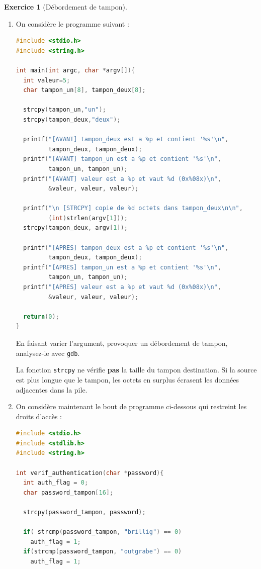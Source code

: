 \documentclass[a4paper,11pt]{article}
\theoremstyle{plain}
\theoremstyle{definition}
\newtheorem{exercice}{Exercice}
\begin{document}
\begin{exercice}[Débordement de tampon]
\begin{enumerate}
\item
On considère le programme suivant :
\begin{lstlisting}[language=C]
#include <stdio.h>
#include <string.h>

int main(int argc, char *argv[]){
  int valeur=5;
  char tampon_un[8], tampon_deux[8];

  strcpy(tampon_un,"un");
  strcpy(tampon_deux,"deux");

  printf("[AVANT] tampon_deux est a %p et contient '%s'\n",
         tampon_deux, tampon_deux);
  printf("[AVANT] tampon_un est a %p et contient '%s'\n",
         tampon_un, tampon_un);
  printf("[AVANT] valeur est a %p et vaut %d (0x%08x)\n",
         &valeur, valeur, valeur);

  printf("\n [STRCPY] copie de %d octets dans tampon_deux\n\n",
         (int)strlen(argv[1]));
  strcpy(tampon_deux, argv[1]);

  printf("[APRES] tampon_deux est a %p et contient '%s'\n",
         tampon_deux, tampon_deux);
  printf("[APRES] tampon_un est a %p et contient '%s'\n",
         tampon_un, tampon_un);
  printf("[APRES] valeur est a %p et vaut %d (0x%08x)\n",
         &valeur, valeur, valeur);

  return(0);
}
\end{lstlisting}

En faisant varier l'argument, provoquer un débordement de tampon, analysez-le avec \texttt{gdb}.

\begin{pointcle}
La fonction \texttt{strcpy} ne vérifie \textbf{pas} la taille du tampon destination. Si la source est plus longue que le tampon, les octets en surplus écrasent les données adjacentes dans la pile.
\end{pointcle}

\item  On considère maintenant le bout de programme ci-dessous qui restreint les droits d'accès :

\begin{lstlisting}[language=C]
#include <stdio.h>
#include <stdlib.h>
#include <string.h>

int verif_authentication(char *password){
  int auth_flag = 0;
  char password_tampon[16];

  strcpy(password_tampon, password);

  if( strcmp(password_tampon, "brillig") == 0)
    auth_flag = 1;
  if(strcmp(password_tampon, "outgrabe") == 0)
    auth_flag = 1;


\end{lstlisting}
\end{enumerate}
\end{exercice}
\end{document}
